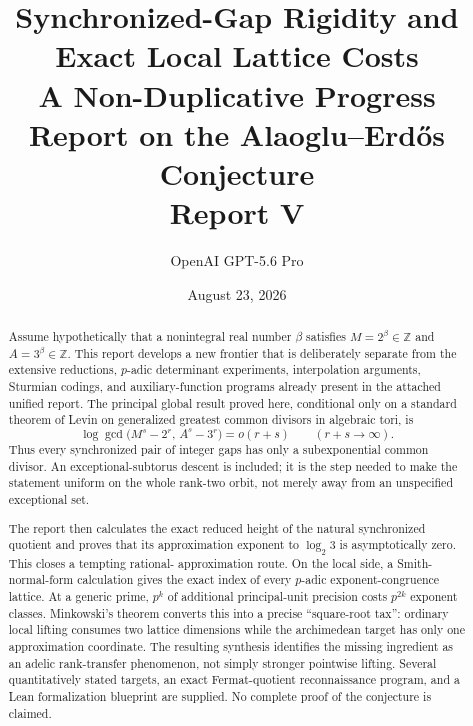 \documentclass[11pt,oneside]{article}
\title{\vspace{-2.5em}
  {\LARGE\bfseries Synchronized-Gap Rigidity and Exact Local Lattice Costs}\\[0.45em]
  {\Large A Non-Duplicative Progress Report on the Alaoglu--Erd\H{o}s Conjecture}\\[0.9em]
  {\large Report V}}
\author{OpenAI GPT-5.6 Pro}
\date{August 23, 2026}
\theoremstyle{definition}
\newcommand{\Z}{\mathbb{Z}}
\begin{document}
\maketitle

\begin{abstract}
Assume hypothetically that a nonintegral real number $\beta$ satisfies
$M=2^\beta\in\Z$ and $A=3^\beta\in\Z$.  This report develops a new
frontier that is deliberately separate from the extensive reductions,
$p$-adic determinant experiments, interpolation arguments, Sturmian
codings, and auxiliary-function programs already present in the attached
unified report.  The principal global result proved here, conditional only
on a standard theorem of Levin on generalized greatest common divisors in
algebraic tori, is
\[
  \log\gcd\bigl(M^s-2^r,\,A^s-3^r\bigr)=o(r+s)
  \qquad (r+s\to\infty).
\]
Thus every synchronized pair of integer gaps has only a subexponential
common divisor.  An exceptional-subtorus descent is included; it is the
step needed to make the statement uniform on the whole rank-two orbit,
not merely away from an unspecified exceptional set.

The report then calculates the exact reduced height of the natural
synchronized quotient and proves that its approximation exponent to
$\log_2 3$ is asymptotically zero.  This closes a tempting rational-
approximation route.  On the local side, a Smith-normal-form calculation
gives the exact index of every $p$-adic exponent-congruence lattice.  At a
generic prime, $p^k$ of additional principal-unit precision costs
$p^{2k}$ exponent classes.  Minkowski's theorem converts this into a
precise ``square-root tax'': ordinary local lifting consumes two lattice
dimensions while the archimedean target has only one approximation
coordinate.  The resulting synthesis identifies the missing ingredient
as an adelic rank-transfer phenomenon, not simply stronger pointwise
lifting.  Several quantitatively stated targets, an exact Fermat-quotient
reconnaissance program, and a Lean formalization blueprint are supplied.
No complete proof of the conjecture is claimed.
\end{abstract}
\end{document}
